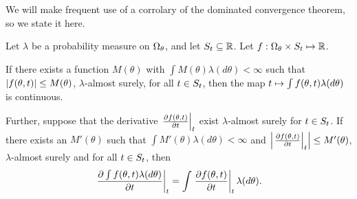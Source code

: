 
We will make frequent use of a corrolary of the dominated convergence
theorem, so we state it here.

\begin{thm}
\citep[Theorem 16.8]{billingsley:1986:probability}
%
Let $\lambda$ be a probability measure on $\Omega_{\theta}$, and let $S_t \subseteq
\mathbb{R}$.  Let $f:\Omega_{\theta} \times S_t \mapsto \mathbb{R}$.

If there exists a function $M(\theta)$ with $\int M(\theta) \lambda(d\theta) <
\infty$ such that $\left|f(\theta, t)\right| \le M(\theta)$, $\lambda$-almost surely,
for all $t \in S_t$, then the map $t \mapsto \int f(\theta, t)
\lambda(d\theta)$ is continuous.

Further, suppose that the derivative $\left.\frac{\partial f(\theta, t)}{\partial
t}\right\vert_{t}$ exist $\lambda$-almost surely for $t \in S_t$.  If there exists
an $M'(\theta)$ such that $\int M'(\theta) \lambda(d\theta) < \infty$ and
$\left|\left.\frac{\partial f(\theta, t)}{\partial t}\right\vert_{t}\right| \le M'(\theta)$,
$\lambda$-almost surely and for all $t \in S_t$, then
%
\begin{align*}
%
\fracat{\partial \int f(\theta, \t) \lambda(d\theta)}{\partial \t}{\t} =
     \int \fracat{\partial f(\theta, \t)}{\partial \t}{\t} \lambda(d\theta).
%
\end{align*}
%
\end{thm}



